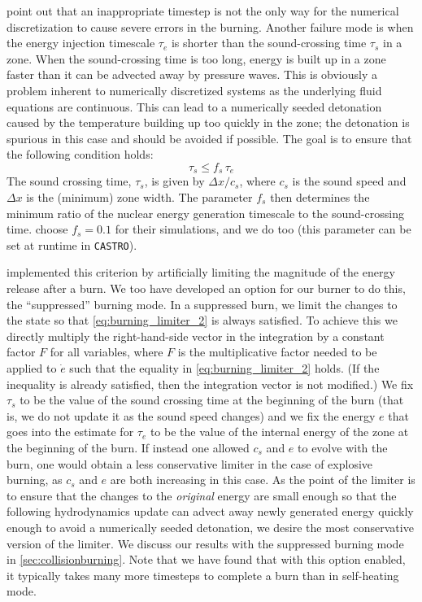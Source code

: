 \documentclass[twocolumn,numberedappendix]{../aastex6}
\newcommand{\castro}{\texttt{CASTRO}}
\begin{document}
\citet{kushnir:2013} point out that an inappropriate timestep is 
not the only way for the numerical discretization to cause 
severe errors in the burning. Another failure mode is when
the energy injection timescale
$\tau_e$ is shorter than the sound-crossing time $\tau_s$ in a zone.
When the sound-crossing time is too long, energy is built up in
a zone faster than it can be advected away by pressure waves.
This is obviously a problem inherent to numerically discretized
systems as the underlying fluid equations are continuous.
This can lead to a numerically seeded detonation caused by the
temperature building up too quickly in the zone; the detonation
is spurious in this case and should be avoided if possible.
The goal is to ensure that the following condition holds:
\begin{equation}
  \tau_s \leq f_{s}\, \tau_e \label{eq:burning_limiter_2}
\end{equation}
The sound crossing time, $\tau_s$, is given by $\Delta x / c_s$, 
where $c_s$ is the sound speed and $\Delta x$ is the (minimum) 
zone width. The parameter $f_{s}$ then determines the minimum
ratio of the nuclear energy generation timescale to the 
sound-crossing time. \citet{kushnir:2013} choose $f_{s} = 0.1$ 
for their simulations, and we do too (this parameter can be set 
at runtime in \castro).

\citet{kushnir:2013} implemented this criterion by artificially 
limiting the magnitude of the energy release after a burn. We
too have developed an option for our burner to do this,
the ``suppressed'' burning mode. In a suppressed burn, we limit
the changes to the state so that \autoref{eq:burning_limiter_2}
is always satisfied. To achieve this we directly multiply the
right-hand-side vector in the integration by a constant factor $F$
for all variables, where $F$ is the multiplicative factor needed to
be applied to $\dot{e}$ such that the equality in \autoref{eq:burning_limiter_2}
holds. (If the inequality is already satisfied, then the integration
vector is not modified.) We fix $\tau_s$ to be the value of the sound
crossing time at the beginning of the burn (that is, we do not
update it as the sound speed changes) and we fix the energy $e$
that goes into the estimate for $\tau_e$ to be the value of the
internal energy of the zone at the beginning of the burn. If
instead one allowed $c_s$ and $e$ to evolve with the burn, one
would obtain a less conservative limiter in the case of explosive
burning, as $c_s$ and $e$ are both increasing in this case.
As the point of the limiter is to ensure that the changes to the
\textit{original} energy are small enough so that the following
hydrodynamics update can advect away newly generated energy
quickly enough to avoid a numerically seeded detonation,
we desire the most conservative version of the limiter. We discuss
our results with the suppressed burning mode in \autoref{sec:collisionburning}.
Note that we have found that with this option enabled, it typically takes
many more timesteps to complete a burn than in self-heating mode.
\end{document}
